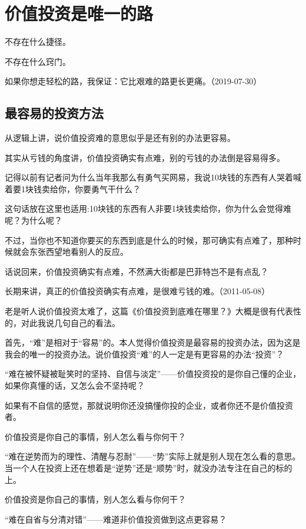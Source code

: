 
\section{价值投资是唯一的路}

不存在什么捷径。

不存在什么窍门。

如果你想走轻松的路，我保证：它比艰难的路更长更痛。（2019-07-30）

\subsection{最容易的投资方法}

从逻辑上讲，说价值投资难的意思似乎是还有别的办法更容易。

其实从亏钱的角度讲，价值投资确实有点难，别的亏钱的办法倒是容易得多。

记得以前有记者问为什么当年我那么有勇气买网易，我说10块钱的东西有人哭着喊着要1块钱卖给你，你要勇气干什么？

这句话放在这里也适用:10块钱的东西有人非要1块钱卖给你，你为什么会觉得难呢？为什么呢？

不过，当你也不知道你要买的东西到底是什么的时候，那可确实有点难了，那种时候就会东张西望地看别人的反应。

话说回来，价值投资确实有点难，不然满大街都是巴菲特岂不是有点乱？

长期来讲，真正的价值投资确实有点难，是很难亏钱的难。（2011-05-08）

老是听人说价值投资太难了，这篇《价值投资到底难在哪里？》大概是很有代表性的，对此我说几句自己的看法。

首先，“难”是相对于“容易”的。本人觉得价值投资是最容易的投资办法，因为这是我会的唯一的投资办法。说价值投资“难”的人一定是有更容易的办法“投资”？

“难在被怀疑被耻笑时的坚持、自信与淡定”——价值投资投的是你自己懂的企业，如果你真懂的话，又怎么会不坚持呢？

如果有不自信的感觉，那就说明你还没搞懂你投的企业，或者你还不是价值投资者。

价值投资是你自己的事情，别人怎么看与你何干？

“难在逆势而为的理性、清醒与忍耐”——“势”实际上就是别人现在怎么看的意思。当一个人在投资上还在想着是“逆势”还是“顺势”时，就没办法专注在自己的标的上。

价值投资是你自己的事情，别人怎么看与你何干？

“难在自省与分清对错”——难道非价值投资做到这点更容易？

